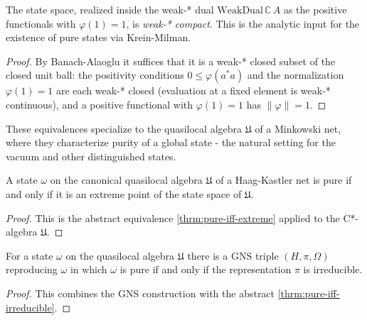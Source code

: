 \begin{theorem}
    \label{thrm:state-space-weak-compact}
    \leanok
    The state space, realized inside the weak-* dual $\mathrm{WeakDual}\,\mathbb{C}\,A$ as the positive functionals with $\varphi(1) = 1$, is \emph{weak-* compact}. This is the analytic input for the existence of pure states via Krein-Milman.
\end{theorem}
\begin{proof}
    \leanok
    By Banach-Alaoglu it suffices that it is a weak-* closed subset of the closed unit ball: the positivity conditions $0 \le \varphi(a^* a)$ and the normalization $\varphi(1) = 1$ are each weak-* closed (evaluation at a fixed element is weak-* continuous), and a positive functional with $\varphi(1)=1$ has $\|\varphi\| = 1$.
\end{proof}

These equivalences specialize to the quasilocal algebra $\mathfrak{U}$ of a Minkowski net, where they characterize purity of a global state - the natural setting for the vacuum and other distinguished states.

\begin{theorem}
    \label{thrm:pure-iff-extreme-quasilocal}
    \leanok
    A state $\omega$ on the canonical quasilocal algebra $\mathfrak{U}$ of a Haag-Kastler net is pure if and only if it is an extreme point of the state space of $\mathfrak{U}$.
\end{theorem}
\begin{proof}
    \leanok
    This is the abstract equivalence \ref{thrm:pure-iff-extreme} applied to the C*-algebra $\mathfrak{U}$.
\end{proof}

\begin{theorem}
    \label{thrm:pure-iff-irreducible-quasilocal}
    \leanok
    For a state $\omega$ on the quasilocal algebra $\mathfrak{U}$ there is a GNS triple $(H, \pi, \Omega)$ reproducing $\omega$ in which $\omega$ is pure if and only if the representation $\pi$ is irreducible.
\end{theorem}
\begin{proof}
    \leanok
    This combines the GNS construction with the abstract \ref{thrm:pure-iff-irreducible}.
\end{proof}

